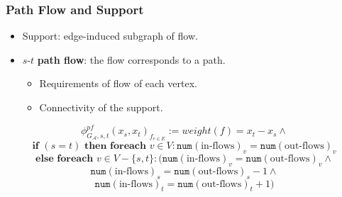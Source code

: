 \documentclass[11pt]{beamer}
\begin{document}
\begin{frame}\frametitle{Path Flow and Support}


\begin{itemize}


\item Support: edge-induced subgraph of flow.

\item  $s$-$t$ \textbf{path flow}: the flow corresponds to a path.
\begin{itemize}
\item Requirements of flow of each vertex.
\item Connectivity of the support.
\end{itemize}

\end{itemize}
\pause

\[\phi^{pf}_{G_\mathcal{A}, s,t}(x_s, x_t)_{f_{e\in E}}:= weight(f) = x_t - x_s \wedge\]
\[\textbf{if }(s = t) \textbf{ then foreach } v\in V: \texttt{num}(\text{in-flows})_v = \texttt{num}(\text{out-flows})_v\]
\[\textbf{else} \textbf{ foreach } v\in V-\{s,t\}: (\texttt{num}(\text{in-flows})_v = \texttt{num}(\text{out-flows})_v \wedge\]
\[\texttt{num}(\text{in-flows})_s = \texttt{num}(
\text{out-flows})_s - 1 \wedge \]
\[\texttt{num}(\text{in-flows})_t = \texttt{num}(\text{out-flows})_t + 1 ) \]

\end{frame}
\end{document}
